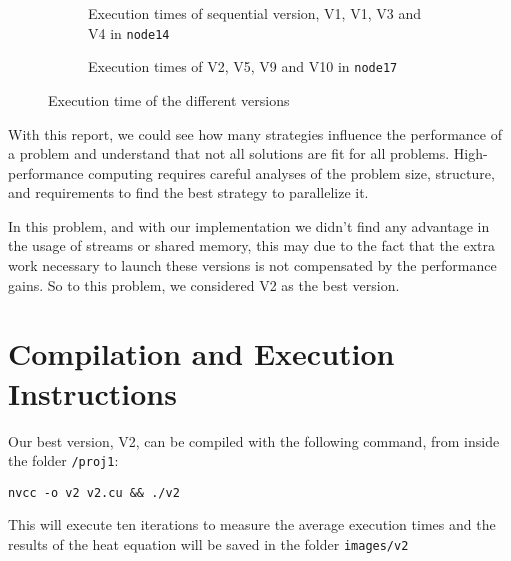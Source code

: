 \documentclass[conference]{IEEEtran}
\begin{document}
\begin{figure}[ht]
  \centering
\begin{subfigure}[b]{\columnwidth}


\caption{Execution times of sequential version, V1, V1, V3 and V4 in \texttt{node14}}
\label{fig:executionTimeCompareNode14}
  \end{subfigure}
\begin{subfigure}[b]{\columnwidth}
\caption{Execution times of V2, V5, V9 and V10 in  \texttt{node17}}
\label{fig:executionTimeCompareNode17}
\end{subfigure}
  \caption{Execution time of the different versions}
  \label{fig:executionTimeCompare}
\end{figure}

With this report, we could see how many strategies influence the performance of a problem and understand that not all solutions are fit for all problems. High-performance computing requires careful analyses of the problem size, structure, and requirements to find the best strategy to parallelize it.

In this problem, and with our implementation we didn't find any advantage in the usage of streams or shared memory, this may due to the fact that the extra work necessary to launch these versions is not compensated by the performance gains. So to this problem, we considered V2 as the best version.

\section{Compilation and Execution Instructions}
Our best version, V2, can be compiled with the following command, from inside the folder \texttt{/proj1}:
\begin{verbatim}
nvcc -o v2 v2.cu && ./v2
\end{verbatim}
This will execute ten iterations to measure the average execution times and the results of the heat equation will be saved in the folder \texttt{images/v2}


\printbibliography
\end{document}

